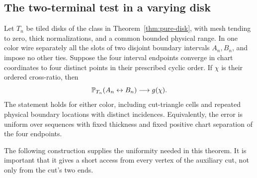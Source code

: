 \subsection{The two-terminal test in a varying disk}

\begin{theorem}
\label{thm:moving-crossing}
Let $T_n$ be tiled disks of the class in
Theorem~\ref{thm:pure-disk}, with mesh tending to zero, thick
normalizations, and a common bounded physical range.  In one color
wire separately all the slots of two disjoint boundary intervals
$A_n,B_n$, and impose no other ties.  Suppose the four interval
endpoints converge in chart coordinates to four distinct points in
their prescribed cyclic order.  If $\chi$ is their ordered
cross-ratio, then
\[
 \mathbb P_{T_n}(A_n\leftrightarrow B_n)\longrightarrow g(\chi).
\]
The statement holds for either color, including cut-triangle cells
and repeated physical boundary locations with distinct incidences.
Equivalently, the error is uniform over sequences with fixed
thickness and fixed positive chart separation of the four endpoints.
\end{theorem}

The following construction supplies the uniformity needed in this
theorem.  It is important that it gives a short access from every
vertex of the auxiliary cut, not only from the cut's two ends.

